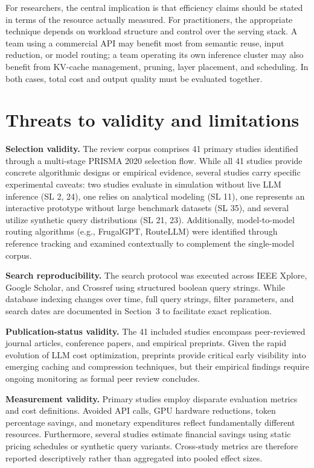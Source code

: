 \IfFileExists{jair.cls}{\documentclass{jair}}{\documentclass[manuscript,nonacm,screen]{acmart}}
\begin{document}
For researchers, the central implication is that efficiency claims should be stated in terms of the resource actually measured. For practitioners, the appropriate technique depends on workload structure and control over the serving stack. A team using a commercial API may benefit most from semantic reuse, input reduction, or model routing; a team operating its own inference cluster may also benefit from KV-cache management, pruning, layer placement, and scheduling. In both cases, total cost and output quality must be evaluated together.

\section{Threats to validity and limitations}

\textbf{Selection validity.} The review corpus comprises 41 primary studies identified through a multi-stage PRISMA 2020 selection flow. While all 41 studies provide concrete algorithmic designs or empirical evidence, several studies carry specific experimental caveats: two studies evaluate in simulation without live LLM inference (SL 2, 24), one relies on analytical modeling (SL 11), one represents an interactive prototype without large benchmark datasets (SL 35), and several utilize synthetic query distributions (SL 21, 23). Additionally, model-to-model routing algorithms (e.g., FrugalGPT, RouteLLM) were identified through reference tracking and examined contextually to complement the single-model corpus.

\textbf{Search reproducibility.} The search protocol was executed across IEEE Xplore, Google Scholar, and Crossref using structured boolean query strings. While database indexing changes over time, full query strings, filter parameters, and search dates are documented in Section~3 to facilitate exact replication.

\textbf{Publication-status validity.} The 41 included studies encompass peer-reviewed journal articles, conference papers, and empirical preprints. Given the rapid evolution of LLM cost optimization, preprints provide critical early visibility into emerging caching and compression techniques, but their empirical findings require ongoing monitoring as formal peer review concludes.

\textbf{Measurement validity.} Primary studies employ disparate evaluation metrics and cost definitions. Avoided API calls, GPU hardware reductions, token percentage savings, and monetary expenditures reflect fundamentally different resources. Furthermore, several studies estimate financial savings using static pricing schedules or synthetic query variants. Cross-study metrics are therefore reported descriptively rather than aggregated into pooled effect sizes.
\end{document}
